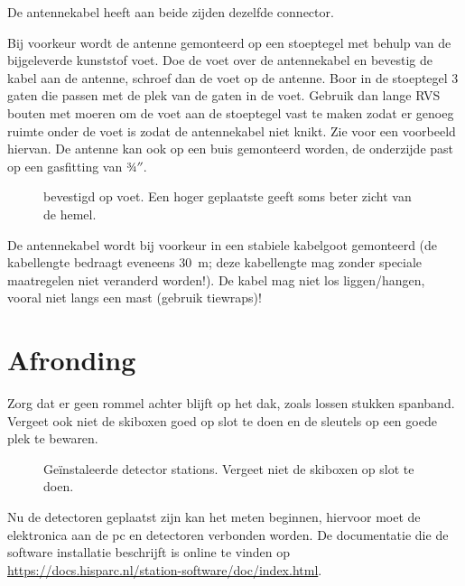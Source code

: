 De \gps antennekabel heeft aan beide zijden dezelfde connector.

Bij voorkeur wordt de \gps antenne gemonteerd op een stoeptegel met
behulp van de bijgeleverde kunststof voet. Doe de voet over de \gps
antennekabel en bevestig de kabel aan de \gps antenne, schroef dan de
voet op de \gps antenne. Boor in de stoeptegel 3 gaten die passen met de
plek van de gaten in de \gps voet. Gebruik dan lange RVS bouten met
moeren om de voet aan de stoeptegel vast te maken zodat er genoeg ruimte
onder de voet is zodat de antennekabel niet knikt. Zie
 voor een voorbeeld hiervan. De \gps antenne
kan ook op een buis gemonteerd worden, de onderzijde past op een
gasfitting van 3⁄4$''$.

\begin{figure}
    \centering
    \caption{\gps bevestigd op voet. Een hoger geplaatste \gps geeft
             soms beter zicht van de hemel.}
\end{figure}

De \gps antennekabel wordt bij voorkeur in een stabiele kabelgoot
gemonteerd (de \gps kabellengte bedraagt eveneens \SI{30}{\meter}; deze
kabellengte mag zonder speciale maatregelen niet veranderd worden!). De
kabel mag niet los liggen/hangen, vooral niet langs een mast (gebruik
tiewraps)!


\section{Afronding}

Zorg dat er geen rommel achter blijft op het dak, zoals lossen stukken
spanband. Vergeet ook niet de skiboxen goed op slot te doen en de
sleutels op een goede plek te bewaren.

\begin{figure}
    \centering
    \caption{Geïnstaleerde detector stations. Vergeet niet de skiboxen
             op slot te doen.}
\end{figure}

Nu de detectoren geplaatst zijn kan het meten beginnen, hiervoor moet de
\hisparc elektronica aan de pc en detectoren verbonden worden. De
documentatie die de software installatie beschrijft is online te vinden
op \url{https://docs.hisparc.nl/station-software/doc/index.html}.




